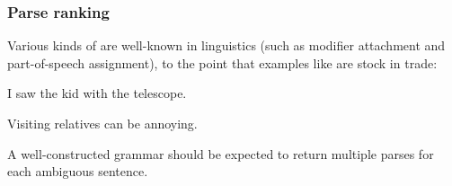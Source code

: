 \documentclass[output=paper,nonflat]{langsci/langscibook}
\begin{document}


\subsubsection{Parse ranking}
\label{cl:prac:rank}

Various kinds of  are well-known in linguistics
(such as modifier attachment and part-of-speech assignment),
to the point that examples like  are stock in trade:

\begin{exe}
\ex\label{cl:ambig-telescope} 
\begin{xlist}
\item I saw the kid with the telescope.
\item Visiting relatives can be annoying.
\end{xlist}
\end{exe}


\noindent
A well-constructed grammar should be expected to return multiple
parses for each ambiguous sentence.
\end{document}
